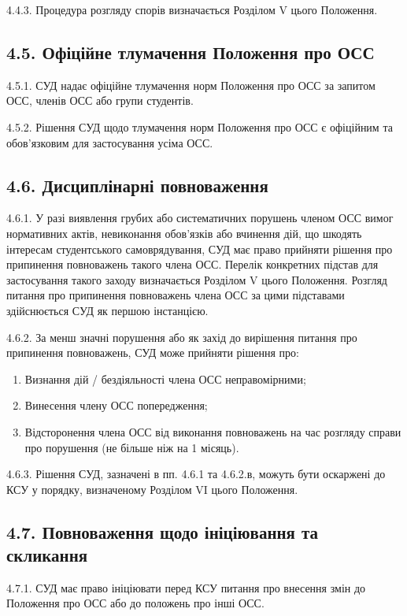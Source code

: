     4.4.3. Процедура розгляду спорів визначається Розділом V цього Положення.

\subsection*{4.5. Офіційне тлумачення Положення про ОСС}
    4.5.1. СУД надає офіційне тлумачення норм Положення про ОСС за запитом ОСС, членів ОСС або групи студентів.

    4.5.2. Рішення СУД щодо тлумачення норм Положення про ОСС є офіційним та обов'язковим для застосування усіма ОСС.

\subsection*{4.6. Дисциплінарні повноваження}
    4.6.1. У разі виявлення грубих або систематичних порушень членом ОСС вимог нормативних актів, невиконання обов'язків або вчинення дій, що шкодять інтересам студентського самоврядування, СУД має право прийняти рішення про припинення повноважень такого члена ОСС. Перелік конкретних підстав для застосування такого заходу визначається Розділом V цього Положення. Розгляд питання про припинення повноважень члена ОСС за цими підставами здійснюється СУД як першою інстанцією.

    4.6.2. За менш значні порушення або як захід до вирішення питання про припинення повноважень, СУД може прийняти рішення про:
        \begin{enumerate}[label=\alph*)]
            \item Визнання дій / бездіяльності члена ОСС неправомірними;
            \item Винесення члену ОСС попередження;
            \item Відсторонення члена ОСС від виконання повноважень на час розгляду справи про порушення (не більше ніж на 1 місяць).
        \end{enumerate}

    4.6.3. Рішення СУД, зазначені в пп. 4.6.1 та 4.6.2.в, можуть бути оскаржені до КСУ у порядку, визначеному Розділом VI цього Положення.

\subsection*{4.7. Повноваження щодо ініціювання та скликання}
    4.7.1. СУД має право ініціювати перед КСУ питання про внесення змін до Положення про ОСС або до положень про інші ОСС.

